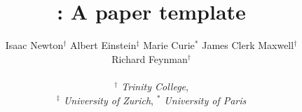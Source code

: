 \title{\sys: A paper template}

\ifdefined\DRAFT
 \pagestyle{fancyplain}
 \rhead{\thedate}
\fi


\author{
 Isaac Newton$^\dagger$\; 
 Albert Einstein$^\ddagger$\;
 Marie Curie$^\ast$\;
 James Clerk Maxwell$^\dagger$\;
\\
 Richard Feynman$^\dagger$\;
\\\\
 \emph{$^\dagger$  Trinity College}, \\
 \emph{$^\ddagger$ University of Zurich}, 
 \emph{$^\ast$ 	 University of Paris}
}

